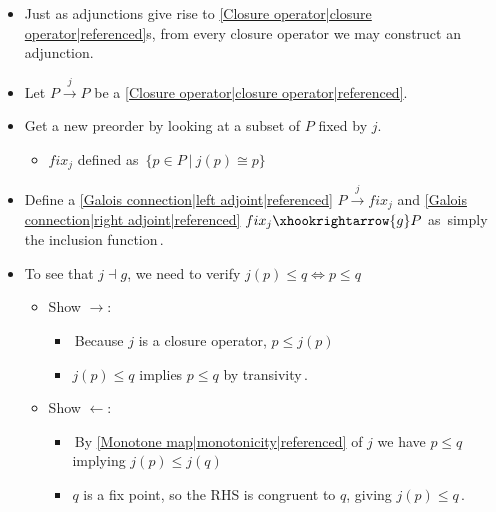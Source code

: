 

\begin{itemize}
    \item Just as adjunctions give rise to \ref{Closure operator|closure operator|referenced}s, from every closure operator we may construct an adjunction.
    \item Let $P \xrightarrow{j} P$ be a \ref{Closure operator|closure operator|referenced}.
    \item Get a new preorder by looking at a subset of $P$ fixed by $j$.
          \begin{itemize}
            \item $fix_j$ defined as \,$\{p \in P\ |\ j(p)\cong p\}$\,
          \end{itemize}
    \item Define a \ref{Galois connection|left adjoint|referenced} $P \xrightarrow{j} fix_j$ and \ref{Galois connection|right adjoint|referenced} $fix_j \xhookrightarrow{g} P$ as \,simply the inclusion function\,.
    \item To see that $j \dashv g$, we need to verify $j(p) \leq q \iff p \leq q$
          \begin{itemize}
            \item Show $\rightarrow$:
                  \begin{itemize}
                    \item \,Because $j$ is a closure operator, $p \leq j(p)$
                    \item $j(p) \leq q$ implies $p \leq q$ by transivity\,.
                  \end{itemize}
            \item Show $\leftarrow$:
                  \begin{itemize}
                    \item \,By \ref{Monotone map|monotonicity|referenced} of $j$ we have $p \leq q$ implying $j(p) \leq j(q)$
                    \item  $q$ is a fix point, so the RHS is congruent to $q$, giving $j(p) \leq q$\,.
                  \end{itemize}
          \end{itemize}
  \end{itemize}